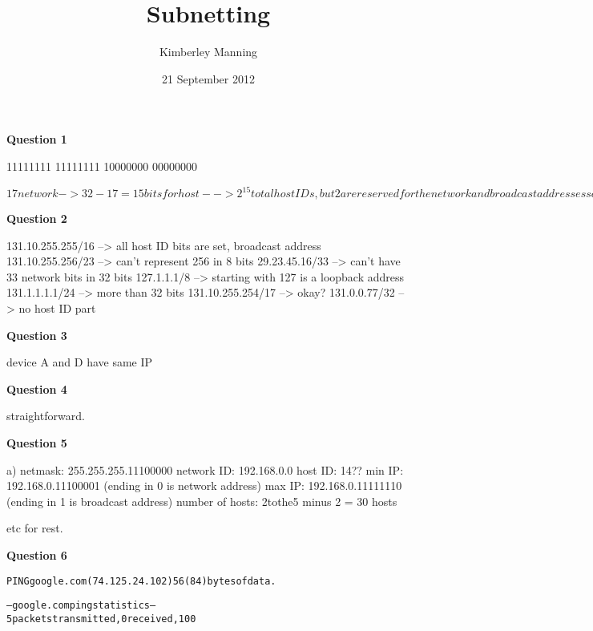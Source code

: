 \documentclass[a4paper,12pt]{report}
\begin{document}
\title{Subnetting}
\author{Kimberley Manning}
\date{21 September 2012}
\newpage

\textbf{Question 1}

11111111 11111111 10000000 00000000

$17 network -> 32-17 = 15 bits for host --> 2^15 total host IDs, but 2 are reserved for the network and broadcast addresses so 2^15 - 2 = 32766 IP addresses$

\textbf{Question 2}

131.10.255.255/16 --> all host ID bits are set, broadcast address
131.10.255.256/23 --> can't represent 256 in 8 bits
29.23.45.16/33 --> can't have 33 network bits in 32 bits
127.1.1.1/8 --> starting with 127 is a loopback address
131.1.1.1.1/24 --> more than 32 bits
131.10.255.254/17 --> okay?
131.0.0.77/32 --> no host ID part

\textbf{Question 3}

device A and D have same IP

\textbf{Question 4}

straightforward.

\textbf{Question 5}

a) netmask: 255.255.255.11100000
network ID: 192.168.0.0
host ID: 14??
min IP: 192.168.0.11100001 (ending in 0 is network address)
max IP: 192.168.0.11111110 (ending in 1 is broadcast address)
number of hosts: 2tothe5 minus 2 = 30 hosts

etc for rest.

\textbf{Question 6}

\begin{alltt}
PING google.com (74.125.24.102) 56(84) bytes of data.

--- google.com ping statistics ---
5 packets transmitted, 0 received, 100% packet loss, time 3999ms
\end{alltt}
\end{document}
